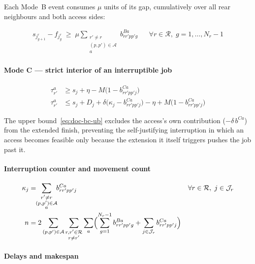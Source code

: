 Each Mode~B event consumes $\mu$ units of its gap, cumulatively over
all rear neighbours and both access sides:

\begin{align}
s_{j^r_{g+1}} - f_{j^r_g} \;\ge\;
\mu \!\!\sum_{\substack{r' \ne r \\ (p,p') \in \mathcal{A} \\ a}}\!\! b^{Ba}_{rr'pp'g}
&& \forall r \in \mathcal{R},\; g = 1, \ldots, N_r - 1
\end{align}

\paragraph{Mode C --- strict interior of an interruptible job}

\begin{align}
\tau^a_{r'} &\ge s_j + \eta - M\bigl(1 - b^{Ca}_{rr'pp'j}\bigr) \\
\tau^a_{r'} &\le s_j + D_j + \delta\bigl(\kappa_j - b^{Ca}_{rr'pp'j}\bigr) - \eta
              + M\bigl(1 - b^{Ca}_{rr'pp'j}\bigr)
\label{eq:doc-bc-ub}
\end{align}

The upper bound~\eqref{eq:doc-bc-ub} excludes the access's own
contribution ($-\delta\, b^{Ca}$) from the extended finish, preventing
the self-justifying interruption in which an access becomes feasible
only because the extension it itself triggers pushes the job past it.

\paragraph{Interruption counter and movement count}

\begin{align}
\kappa_j &= \!\!\sum_{\substack{r' \ne r \\ (p,p') \in \mathcal{A} \\ a}}\!\! b^{Ca}_{rr'pp'j}
&& \forall r \in \mathcal{R},\; j \in \mathcal{J}_r \\
%
n &= 2 \sum_{(p,p') \in \mathcal{A}}
     \sum_{\substack{r,r' \in \mathcal{R} \\ r \neq r'}}
     \sum_{a} \Bigl(
       \sum_{g=1}^{N_r-1} b^{Ba}_{rr'pp'g}
       + \sum_{j \in \mathcal{J}_r} b^{Ca}_{rr'pp'j}
     \Bigr)
\end{align}

\paragraph{Delays and makespan}

